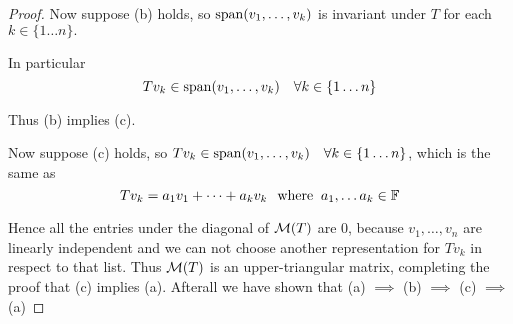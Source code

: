 \begin{proof}
  Now suppose (b) holds, so $\operatorname{span} (v_1, \ldots, v_k)$ is invariant under $T$ for each $k \in \{1 \ldots n\}.$

  In particular
  \begin{equation}
    T v_k \in \operatorname{span} (v_1, \ldots, v_k) \quad \forall k \in \{1 \ldots n\}
  \end{equation}

  Thus (b) implies (c).

  Now suppose (c) holds, so $T v_k \in \operatorname{span} (v_1, \ldots, v_k) \quad \forall k \in \{1 \ldots n\}$, which is the same as
  \begin{equation}
    T v_k = a_1 v_1 + \cdots + a_k v_k \;\;\, \text{where}\;\; a_1, \dots a_k \in \mathbb{F}
  \end{equation}

  Hence all the entries under the diagonal of $\mathcal{M} (T)$ are $0$, because $v_1, \ldots, v_n$ are linearly independent and we can not choose another representation for $T v_k$ in respect to that list. Thus $\mathcal{M}(T)$ is an upper-triangular matrix, completing the proof that (c) implies (a). Afterall we have shown that (a) $\implies$ (b) $\implies$ (c) $\implies$ (a)
\end{proof}

